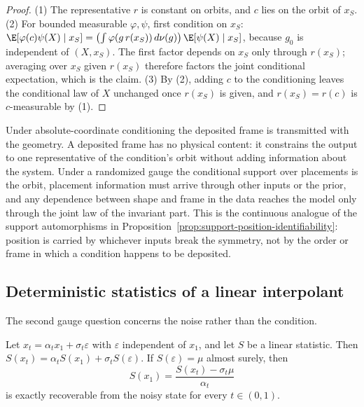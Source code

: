 \begin{proof}
(1) The representative $r$ is constant on orbits, and $c$ lies on the orbit of $x_S$.  (2) For
bounded measurable $\varphi,\psi$, first condition on $x_S$:
$\E[\varphi(c)\psi(X)\mid x_S]
=\bigl(\int\varphi(g\,r(x_S))\,d\nu(g)\bigr)\,\E[\psi(X)\mid x_S]$,
because $g_0$ is independent of $(X,x_S)$.  The first factor depends on $x_S$ only through
$r(x_S)$; averaging over $x_S$ given $r(x_S)$ therefore factors the joint conditional
expectation, which is the claim.  (3) By (2), adding $c$ to the conditioning leaves the
conditional law of $X$ unchanged once $r(x_S)$ is given, and $r(x_S)=r(c)$ is $c$-measurable by
(1).
\end{proof}

Under absolute-coordinate conditioning the deposited frame is transmitted with the geometry.  A
deposited frame has no physical content: it constrains the output to one representative of the
condition's orbit without adding information about the system.  Under a randomized gauge the
conditional support over placements is the orbit, placement information must arrive through other
inputs or the prior, and any dependence between shape and frame in the data reaches the model only
through the joint law of the invariant part.  This is the continuous analogue of the support
automorphisms in Proposition~\ref{prop:support-position-identifiability}: position is carried by
whichever inputs break the symmetry, not by the order or frame in which a condition happens to be
deposited.

\subsection{Deterministic statistics of a linear interpolant}

The second gauge question concerns the noise rather than the condition.

\begin{proposition}
\label{prop:interpolant-statistic}
Let $x_t=\alpha_t x_1+\sigma_t\varepsilon$ with $\varepsilon$ independent of $x_1$, and let $S$
be a linear statistic.  Then $S(x_t)=\alpha_tS(x_1)+\sigma_tS(\varepsilon)$.  If
$S(\varepsilon)=\mu$ almost surely, then
\begin{equation}
S(x_1)=\frac{S(x_t)-\sigma_t\mu}{\alpha_t}
\label{eq:book-interpolant-identity}
\end{equation}
is exactly recoverable from the noisy state for every $t\in(0,1)$.
\end{proposition}

